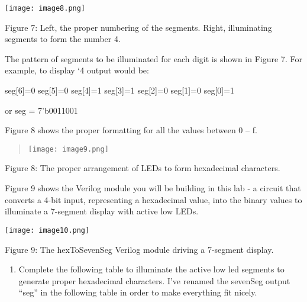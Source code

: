 \texttt{[image: image8.png]}

Figure 7: Left, the proper numbering of the segments. Right,
illuminating segments to form the number 4.

The pattern of segments to be illuminated for each digit is shown in
Figure 7. For example, to display `4 output would be:

seg{[}6{]}=0 seg{[}5{]}=0 seg{[}4{]}=1 seg{[}3{]}=1 seg{[}2{]}=0
seg{[}1{]}=0 seg{[}0{]}=1

or seg = 7'b0011001

Figure 8 shows the proper formatting for all the values between 0 -- f.

\begin{quote}
\texttt{[image: image9.png]}
\end{quote}

Figure 8: The proper arrangement of LEDs to form hexadecimal characters.

Figure 9 shows the Verilog module you will be building in this lab - a
circuit that converts a 4-bit input, representing a hexadecimal value,
into the binary values to illuminate a 7-segment display with active low
LEDs.

\texttt{[image: image10.png]}

Figure 9: The hexToSevenSeg Verilog module driving a 7-segment display.

\begin{enumerate}
\def\labelenumi{\arabic{enumi}.}
\item
  Complete the following table to illuminate the active low led segments
  to generate proper hexadecimal characters. I've renamed the sevenSeg
  output ``seg'' in the following table in order to make everything fit
  nicely.
\end{enumerate}

